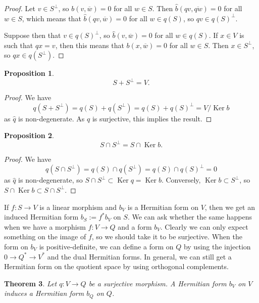 \documentclass[10pt,a4paper]{amsart}
\newtheorem{theo}{Theorem}[section]
\newtheorem{prop}[theo]{Proposition}
\theoremstyle{definition}
\def\ov#1{\overline{#1}}
\DeclareMathOperator{\Ker}{Ker}
\begin{document}
\begin{proof}
Let $v \in S^\perp$, so $b(v, \ov w) = 0$ for all $w \in S$. Then $\hat b(qv, \ov{qw}) = 0$ for all $w \in S$, which means that $\hat b(qv, \ov w) = 0$ for all $w \in q(S)$, so $qv \in q(S)^\perp$.

Suppose then that $v \in q(S)^\perp$, so $\hat b(v, \ov w) = 0$ for all $w \in q(S)$. If $x \in V$ is such that $qx = v$, then this means that $b(x, \ov w) = 0$ for all $w \in S$. Then $x \in S^\perp$, so $qx \in q(S^\perp)$.
\end{proof}



\begin{prop}
\[
S + S^\perp = V.
\]
\end{prop}

\begin{proof}
We have
\[
q(S + S^\perp)
= q(S) + q(S^\perp)
= q(S) + q(S)^\perp
= V / \Ker b
\]
as $\hat q$ is non-degenerate. As $q$ is surjective, this implies the result.
\end{proof}




\begin{prop}
\[
S \cap S^\perp = S \cap \Ker b.
\]
\end{prop}

\begin{proof}
We have
\[
q(S \cap S^\perp)
= q(S) \cap q(S^\perp)
= q(S) \cap q(S)^\perp
= 0
\]
as $\hat q$ is non-degenerate,
so $S \cap S^\perp \subset \Ker q = \Ker b$. Conversely, $\Ker b \subset S^\perp$, so $S \cap \Ker b \subset S \cap S^\perp$.
\end{proof}


If $f : S \to V$ is a linear morphism and $b_V$ is a Hermitian form on $V$, then
we get an induced Hermitian form $b_S := f^*b_V$ on $S$. We can ask whether the
same happens when we have a morphism $f : V \to Q$ and a form $b_V$. Clearly we
can only expect something on the image of $f$, so we should take it to be
surjective. When the form on $b_V$ is positive-definite, we can define a form on
$Q$ by using the injection $0 \to Q^* \to V^*$ and the dual Hermitian forms. In
general, we can still get a Hermitian form on the quotient space by using
orthogonal complements.


\begin{theo}
Let $q : V \to Q$ be a surjective morphism. A Hermitian form $b_V$ on $V$ induces a Hermitian form $b_Q$ on $Q$.
\end{theo}
\end{document}

